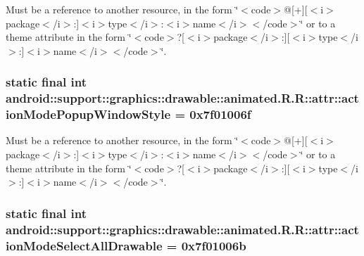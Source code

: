 Must be a reference to another resource, in the form \char`\"{}$<$code$>$@\mbox{[}+\mbox{]}\mbox{[}$<$i$>$package$<$/i$>$:\mbox{]}$<$i$>$type$<$/i$>$:$<$i$>$name$<$/i$>$$<$/code$>$\char`\"{} or to a theme attribute in the form \char`\"{}$<$code$>$?\mbox{[}$<$i$>$package$<$/i$>$:\mbox{]}\mbox{[}$<$i$>$type$<$/i$>$:\mbox{]}$<$i$>$name$<$/i$>$$<$/code$>$\char`\"{}. \hypertarget{classandroid_1_1support_1_1graphics_1_1drawable_1_1animated_1_1_r_1_1attr_8c48e37a09f7a0c0684a5902973f0da3}{
\subsubsection[{actionModePopupWindowStyle}]{\setlength{\rightskip}{0pt plus 5cm}static final int android::support::graphics::drawable::animated.R.R::attr::actionModePopupWindowStyle = 0x7f01006f}}
\label{classandroid_1_1support_1_1graphics_1_1drawable_1_1animated_1_1_r_1_1attr_8c48e37a09f7a0c0684a5902973f0da3}


Must be a reference to another resource, in the form \char`\"{}$<$code$>$@\mbox{[}+\mbox{]}\mbox{[}$<$i$>$package$<$/i$>$:\mbox{]}$<$i$>$type$<$/i$>$:$<$i$>$name$<$/i$>$$<$/code$>$\char`\"{} or to a theme attribute in the form \char`\"{}$<$code$>$?\mbox{[}$<$i$>$package$<$/i$>$:\mbox{]}\mbox{[}$<$i$>$type$<$/i$>$:\mbox{]}$<$i$>$name$<$/i$>$$<$/code$>$\char`\"{}. \hypertarget{classandroid_1_1support_1_1graphics_1_1drawable_1_1animated_1_1_r_1_1attr_4beaf7aba912a0b344433d4e6a98655f}{
\subsubsection[{actionModeSelectAllDrawable}]{\setlength{\rightskip}{0pt plus 5cm}static final int android::support::graphics::drawable::animated.R.R::attr::actionModeSelectAllDrawable = 0x7f01006b}}
\label{classandroid_1_1support_1_1graphics_1_1drawable_1_1animated_1_1_r_1_1attr_4beaf7aba912a0b344433d4e6a98655f}


